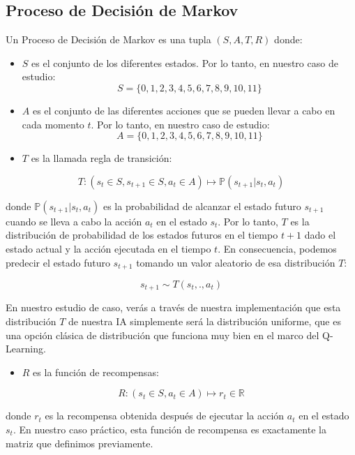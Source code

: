 \documentclass[
]{book}
\providecommand{\tightlist}{%
  \setlength{\itemsep}{0pt}\setlength{\parskip}{0pt}}
\begin{document}
\hypertarget{proceso-de-decisiuxf3n-de-markov}{%
\subsection{Proceso de Decisión de Markov}\label{proceso-de-decisiuxf3n-de-markov}}

Un Proceso de Decisión de Markov es una tupla \((S, A, T, R)\) donde:

\begin{itemize}
\tightlist
\item
  \(S\) es el conjunto de los diferentes estados. Por lo tanto, en nuestro caso de estudio: \[S = \{0,1,2,3,4,5,6,7,8,9,10,11\}\]
\item
  \(A\) es el conjunto de las diferentes acciones que se pueden llevar a cabo en cada momento \(t\). Por lo tanto, en nuestro caso de estudio: \[A = \{0,1,2,3,4,5,6,7,8,9,10,11\}\]
\item
  \(T\) es la llamada regla de transición:
\end{itemize}

\[T : (s_t \in S, s_{t+1} \in S, a_t \in A) \mapsto \mathbb{P}(s_{t+1}|s_t,a_t)\]

donde \(\mathbb {P} (s_{t + 1} | s_t, a_t)\) es la probabilidad de alcanzar el estado futuro \(s_{t + 1}\) cuando se lleva a cabo la acción \(a_t\) en el estado \(s_t\). Por lo tanto, \(T\) es la distribución de probabilidad de los estados futuros en el tiempo \(t + 1\) dado el estado actual y la acción ejecutada en el tiempo \(t\). En consecuencia, podemos predecir el estado futuro \(s_{t + 1}\) tomando un valor aleatorio de esa distribución \(T\):

\[s_{t+1} \sim T(s_t,.,a_t)\]

En nuestro estudio de caso, verás a través de nuestra implementación que esta distribución \(T\) de nuestra IA simplemente será la distribución uniforme, que es una opción clásica de distribución que funciona muy bien en el marco del Q-Learning.

\begin{itemize}
\tightlist
\item
  \(R\) es la función de recompensas:
\end{itemize}

\[R : (s_t \in S, a_t \in A) \mapsto r_t \in \mathbb{R}\]

donde \(r_t\) es la recompensa obtenida después de ejecutar la acción \(a_t\) en el estado \(s_t\). En nuestro caso práctico, esta función de recompensa es exactamente la matriz que definimos previamente.
\end{document}
